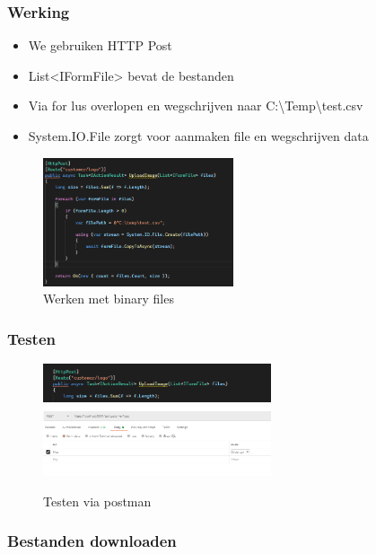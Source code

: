 \documentclass{article}
\begin{document}
\subsubsection{Werking}

\begin{itemize}
    \item We gebruiken HTTP Post
    \item List<IFormFile> bevat de bestanden
    \item Via for lus overlopen en wegschrijven naar C:\textbackslash Temp\textbackslash test.csv
    \item System.IO.File zorgt voor aanmaken file en wegschrijven data
\end{itemize}

\begin{figure}[H]
    \centering
    \includegraphics[width=0.5\textwidth]{binary-files.png}
    \caption{Werken met binary files}
\end{figure}

\subsubsection{Testen}

\begin{figure}[H]
    \centering
    \includegraphics[width=0.6\textwidth]{binary-files-testing.png}
    \includegraphics[width=0.6\textwidth]{binary-files-testing2.png}
    \caption{Testen via postman}
\end{figure}

\subsubsection{Bestanden downloaden}
\end{document}
